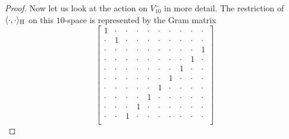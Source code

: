 \begin{proof}
	Now let us look at the action on $V_{10}^{-}$ in more detail. The restriction of 
	$\langle \cdot, \cdot \rangle_{\mathrm{H}}$ on
	this $10$-space is represented by the Gram matrix
	\begin{equation*}
		\begin{bmatrix}
			1 & \cdot & \cdot & \cdot & \cdot & \cdot & \cdot & \cdot & \cdot & \cdot \\
			\cdot & 1 & \cdot & \cdot & \cdot & \cdot & \cdot & \cdot & \cdot & \cdot \\
			\cdot & \cdot & \cdot & \cdot & \cdot & \cdot & \cdot & \cdot & \cdot & 1 \\
			\cdot & \cdot & \cdot & \cdot & \cdot & \cdot & \cdot & \cdot & 1 & \cdot \\
			\cdot & \cdot & \cdot & \cdot & \cdot & \cdot & \cdot & 1 & \cdot & \cdot \\
			\cdot & \cdot & \cdot & \cdot & \cdot & \cdot & 1 & \cdot & \cdot & \cdot \\
			\cdot & \cdot & \cdot & \cdot & \cdot & 1 & \cdot & \cdot & \cdot & \cdot \\
			\cdot & \cdot & \cdot & \cdot & 1 & \cdot & \cdot & \cdot & \cdot & \cdot \\
			\cdot & \cdot & \cdot & 1 & \cdot & \cdot & \cdot & \cdot & \cdot & \cdot \\
			\cdot & \cdot & 1 & \cdot & \cdot & \cdot & \cdot & \cdot & \cdot & \cdot \\
		\end{bmatrix}
	\end{equation*}

\end{proof}
